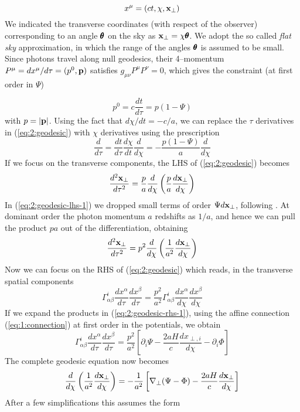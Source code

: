 \begin{equation}
\label{eq:2:coord}
x^{\mu} = (ct,\chi,\mathbf{x}_\perp)
\end{equation}
%
We indicated the transverse coordinates (with respect of the observer) corresponding to an angle $\pmb{\theta}$ on the sky as $\mathbf{x}_\perp=\chi\pmb{\theta}$. We adopt the so called \textit{flat sky} approximation, in which the range of the angles $\pmb{\theta}$ is assumed to be small. Since photons travel along null geodesics, their 4--momentum $P^\mu=dx^\mu/d\tau=(p^0,\mathbf{p})$ satisfies $g_{\mu\nu}P^{\mu}P^{\nu}=0$, which gives the constraint (at first order in $\Psi$)

\begin{equation}
\label{eq:2:nullconstr}
p^0 = c\frac{dt}{d\tau} = p(1-\Psi)
\end{equation} 
%
with $p=\vert\mathbf{p}\vert$. Using the fact that $d\chi/dt = -c/a$, we can replace the $\tau$ derivatives in (\ref{eq:2:geodesic}) with $\chi$ derivatives using the prescription
\begin{equation}
\label{eq:2:tau2chi}
\frac{d}{d\tau} = \frac{dt}{d\tau}\frac{d\chi}{dt}\frac{d}{d\chi} = -\frac{p(1-\Psi)}{a}\frac{d}{d\chi}
\end{equation}
%
If we focus on the transverse components, the LHS of (\ref{eq:2:geodesic}) becomes
\begin{equation}
\label{eq:2:geodesic-lhs-1}
\frac{d^2\mathbf{x}_\perp}{d\tau^2} = \frac{p}{a}\frac{d}{d\chi}\left(\frac{p}{a}\frac{d\mathbf{x}_\perp}{d\chi}\right)
\end{equation}
%
In (\ref{eq:2:geodesic-lhs-1}) we dropped small terms of order $\Psi d\mathbf{x}_\perp$, following \citep{Dodelson-C11}. At dominant order the photon momentum $a$ redshifts as $1/a$, and hence we can pull the product $pa$ out of the differentiation, obtaining 
\begin{equation}
\label{eq:2:geodesic-lhs-2}
\frac{d^2\mathbf{x}_\perp}{d\tau^2} = p^2\frac{d}{d\chi}\left(\frac{1}{a^2}\frac{d\mathbf{x}_\perp}{d\chi}\right)
\end{equation}
%
Now we can focus on the RHS of (\ref{eq:2:geodesic}) which reads, in the transverse spatial components
\begin{equation}
\label{eq:2:geodesic-rhs-1}
\Gamma_{\alpha\beta}^i \frac{d x^\alpha}{d\tau}\frac{d x^\beta}{d\tau} = \frac{p^2}{a^2} \Gamma_{\alpha\beta}^i \frac{d x^\alpha}{d\chi}\frac{d x^\beta}{d\chi}
\end{equation}
%
If we expand the products in (\ref{eq:2:geodesic-rhs-1}), using the affine connection (\ref{eq:1:connection}) at first order in the potentials, we obtain
\begin{equation}
\label{eq:2:geodesic-rhs-2}
\Gamma_{\alpha\beta}^i \frac{d x^\alpha}{d\tau}\frac{d x^\beta}{d\tau} = \frac{p^2}{a^2}\left[\partial_i\Psi-\frac{2aH}{c}\frac{dx_{\perp,i}}{d\chi} -\partial_i\Phi \right]
\end{equation}
%
The complete geodesic equation now becomes 
\begin{equation}
\label{eq:2:geodesic-fo-1}
\frac{d}{d\chi}\left(\frac{1}{a^2}\frac{d\mathbf{x}_\perp}{d\chi}\right) = -\frac{1}{a^2}\left[\nabla_\perp(\Psi-\Phi)-\frac{2aH}{c}\frac{d\mathbf{x}_\perp}{d\chi}\right]
\end{equation}
%
After a few simplifications this assumes the form 

